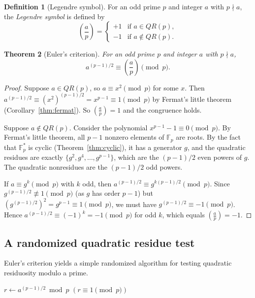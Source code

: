 \documentclass[twoside,12pt]{book}
\theoremstyle{plain}
\newtheorem{theorem}{Theorem}[chapter]
\theoremstyle{definition}
\newtheorem{definition}[theorem]{Definition}
\theoremstyle{remark}
\begin{document}
\begin{definition}[Legendre symbol]
For an odd prime $p$ and integer $a$ with $p \nmid a$, the \emph{Legendre symbol} is defined by
\[
\left(\frac{a}{p}\right) = \begin{cases}
+1 & \text{if } a \in QR(p), \\
-1 & \text{if } a \notin QR(p).
\end{cases}
\]
\end{definition}

\begin{theorem}[Euler's criterion]
\label{thm:euler-criterion}
For an odd prime $p$ and integer $a$ with $p \nmid a$,
\[
a^{(p-1)/2} \equiv \left(\frac{a}{p}\right) \pmod{p}.
\]
\end{theorem}

\begin{proof}
Suppose $a \in QR(p)$, so $a \equiv x^2 \pmod{p}$ for some $x$. Then $a^{(p-1)/2} \equiv (x^2)^{(p-1)/2} = x^{p-1} \equiv 1 \pmod{p}$ by Fermat's little theorem (Corollary~\ref{thm:fermat}). So $\left(\frac{a}{p}\right) = 1$ and the congruence holds.

Suppose $a \notin QR(p)$. Consider the polynomial $x^{p-1} - 1 \equiv 0 \pmod{p}$. By Fermat's little theorem, all $p-1$ nonzero elements of $\mathbb{F}_p$ are roots. By the fact that $\mathbb{F}_p^*$ is cyclic (Theorem~\ref{thm:cyclic}), it has a generator $g$, and the quadratic residues are exactly $\{g^2, g^4, \ldots, g^{p-1}\}$, which are the $(p-1)/2$ even powers of $g$. The quadratic nonresidues are the $(p-1)/2$ odd powers.

If $a \equiv g^k \pmod{p}$ with $k$ odd, then $a^{(p-1)/2} \equiv g^{k(p-1)/2} \pmod{p}$. Since $g^{(p-1)/2} \not\equiv 1 \pmod{p}$ (as $g$ has order $p-1$) but $(g^{(p-1)/2})^2 = g^{p-1} \equiv 1 \pmod{p}$, we must have $g^{(p-1)/2} \equiv -1 \pmod{p}$. Hence $a^{(p-1)/2} \equiv (-1)^k = -1 \pmod{p}$ for odd $k$, which equals $\left(\frac{a}{p}\right) = -1$.
\end{proof}

\subsection{A randomized quadratic residue test}

Euler's criterion yields a simple randomized algorithm for testing quadratic residuosity modulo a prime.

\begin{algorithm}
\caption{Randomized Quadratic Residue Test (modulo prime $p$)}
\label{alg:qr-test}
\begin{algorithmic}[1]
 
    \State $r \gets a^{(p-1)/2} \bmod p$ 
    \State \Return $(r \equiv 1 \pmod{p})$
\EndFunction
\end{algorithmic}
\end{algorithm}
\end{document}
